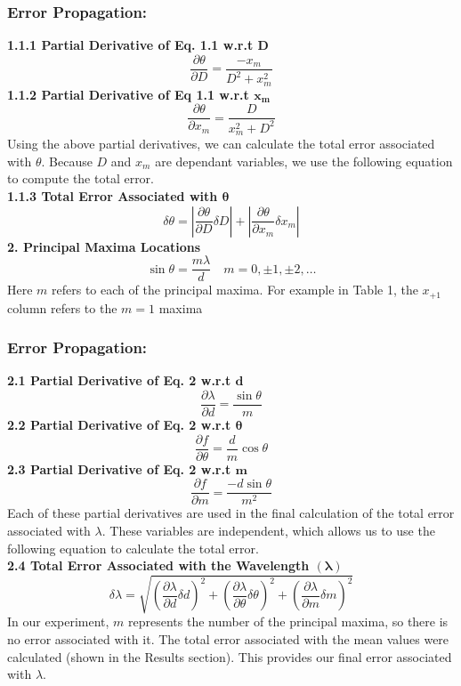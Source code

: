 \documentclass[12pt]{article}
\begin{document}
\subsubsection*{Error Propagation:}
    \noindent\textbf{1.1.1 Partial Derivative of Eq. 1.1 w.r.t $\bm{D}$}\[\frac{\partial\theta}{\partial D}=\frac{-x_m}{D^2+x_m^2}\]
    \textbf{1.1.2 Partial Derivative of Eq 1.1 w.r.t $\bm{x_m}$}\[\frac{\partial\theta}{\partial x_m}=\frac{D}{x_m^2+D^2}\]
    Using the above partial derivatives, we can calculate the total error associated with $\theta.$ Because $D$ and $x_m$ are dependant variables, we use the following equation to compute the total error.\\
    \textbf{1.1.3 Total Error Associated with $\bm{\theta}$}\[\delta\theta=\left|\frac{\partial\theta}{\partial D}\delta D\right|+\left|\frac{\partial\theta}{\partial x_m}\delta x_m\right|\]
\noindent\textbf{2. Principal Maxima Locations}\[\sin\theta=\frac{m\lambda}{d} \quad m=0,\pm1,\pm2,\dots\]
    Here $m$ refers to each of the principal maxima. For example in Table 1, the $x_{+1}$ column refers to the $m=1$ maxima
\subsubsection*{Error Propagation:}
    \noindent\textbf{2.1 Partial Derivative of Eq. 2 w.r.t $\bm d$}\[\frac{\partial\lambda}{\partial d}=\frac{\sin\theta}{m}\]
    \textbf{2.2 Partial Derivative of Eq. 2 w.r.t $\bm \theta$} \[\frac{\partial f}{\partial \theta}=\frac{d}{m}\cos\theta\]
    \textbf{2.3 Partial Derivative of Eq. 2 w.r.t $\bm m$} \[\frac{\partial f}{\partial m}=\frac{-d\sin\theta}{m^2}\]
    Each of these partial derivatives are used in the final calculation of the total error associated with $\lambda.$ These variables are independent, which allows us to use the following equation to calculate the total error.\\
    \textbf{2.4 Total Error Associated with the Wavelength $\bm{(\lambda)}$}\[\delta \lambda =\sqrt{\left(\frac{\partial \lambda}{\partial d}\delta d\right)^2+\left(\frac{\partial \lambda}{\partial \theta}\delta \theta\right)^2+\left(\frac{\partial \lambda}{\partial m}\delta m\right)^2}\]
    In our experiment, $m$ represents the number of the principal maxima, so there is no error associated with it. The total error associated with the mean values were calculated (shown in the Results section). This provides our final error associated with $\lambda$.\\
\end{document}
